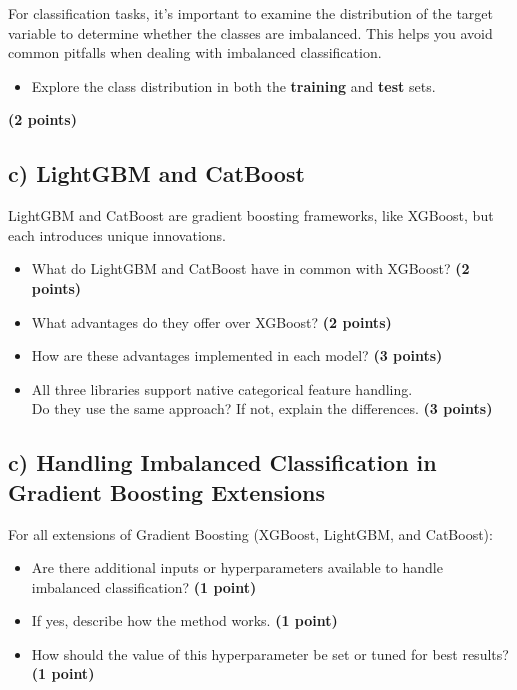 \documentclass[
  letterpaper,
  DIV=11,
  numbers=noendperiod]{scrreprt}
\providecommand{\tightlist}{%
  \setlength{\itemsep}{0pt}\setlength{\parskip}{0pt}}\usepackage{longtable,booktabs,array}
\begin{document}
For classification tasks, it's important to examine the distribution of
the target variable to determine whether the classes are imbalanced.
This helps you avoid common pitfalls when dealing with imbalanced
classification.

\begin{itemize}
\tightlist
\item
  Explore the class distribution in both the \textbf{training} and
  \textbf{test} sets.
\end{itemize}

\textbf{(2 points)}

\subsection{c) LightGBM and CatBoost}\label{c-lightgbm-and-catboost}

LightGBM and CatBoost are gradient boosting frameworks, like XGBoost,
but each introduces unique innovations.

\begin{itemize}
\tightlist
\item
  What do LightGBM and CatBoost have in common with XGBoost? \textbf{(2
  points)}\\
\item
  What advantages do they offer over XGBoost? \textbf{(2 points)}\\
\item
  How are these advantages implemented in each model? \textbf{(3
  points)}\\
\item
  All three libraries support native categorical feature handling.\\
  Do they use the same approach? If not, explain the differences.
  \textbf{(3 points)}
\end{itemize}

\subsection{c) Handling Imbalanced Classification in Gradient Boosting
Extensions}\label{c-handling-imbalanced-classification-in-gradient-boosting-extensions}

For all extensions of Gradient Boosting (XGBoost, LightGBM, and
CatBoost):

\begin{itemize}
\tightlist
\item
  Are there additional inputs or hyperparameters available to handle
  imbalanced classification? \textbf{(1 point)}\\
\item
  If yes, describe how the method works. \textbf{(1 point)}\\
\item
  How should the value of this hyperparameter be set or tuned for best
  results? \textbf{(1 point)}
\end{itemize}
\end{document}
